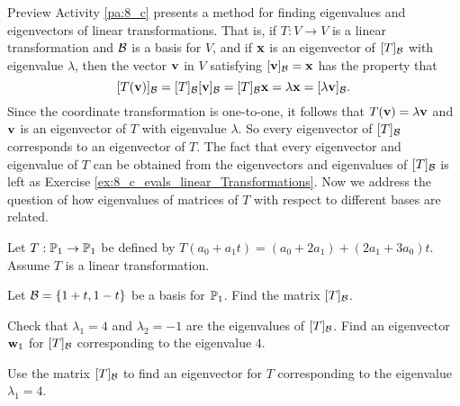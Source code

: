 
Preview Activity \ref{pa:8_c} presents a method for finding eigenvalues and eigenvectors of linear transformations. That is, if $T: V \to V$ is a linear transformation and $\mathcal{B}$ is a basis for $V$, and if $\mathbf{x}$ is an eigenvector of $[T]_{\mathcal{B}}$ with eigenvalue $\lambda$, then the vector $\mathbf{v}$ in $V$ satisfying $[\mathbf{v}]_{\mathcal{B}}=\mathbf{x}$ has the property that 
\[[T(\mathbf{v})]_{\mathcal{B}} = [T]_{\mathcal{B}}[\mathbf{v}]_{\mathcal{B}} = [T]_{\mathcal{B}} \mathbf{x} = \lambda \mathbf{x} = [\lambda \mathbf{v}]_{\mathcal{B}}.\]
Since the coordinate transformation is one-to-one, it follows that $T(\mathbf{v}) = \lambda \mathbf{v}$ and $\mathbf{v}$ is an eigenvector of $T$ with eigenvalue $\lambda$. So every eigenvector of $[T]_{\mathcal{B}}$ corresponds to an eigenvector of $T$. The fact that every eigenvector and eigenvalue of $T$ can be obtained from the eigenvectors and eigenvalues of $[T]_{\mathcal{B}}$ is left as Exercise \ref{ex:8_c_evals_linear_Transformations}.  Now we address the question of how eigenvalues of matrices of $T$ with respect to different bases are related.



\begin{activity} \label{act:8_c_ltev2} Let $T: \mathbb{P}_1 \to \mathbb{P}_1$ be defined by $T(a_0+a_1t) = (a_0+2a_1) + (2a_1+3a_0)t$. Assume $T$ is a linear transformation.
	\ba
	\item Let $\mathcal{B} = \{1+t,1-t\}$ be a basis for $\mathbb{P}_1$. Find the matrix $[T]_{\mathcal{B}}$.
	
	
	\item Check that $\lambda_1 = 4$ and $\lambda_2 = -1$ are the eigenvalues of $[T]_{\mathcal{B}}$. Find an eigenvector $\mathbf{w}_1$ for $[T]_{\mathcal{B}}$ corresponding to the eigenvalue $4$.
	
	
	\item Use the matrix $[T]_{\mathcal{B}}$ to find an eigenvector for $T$ corresponding to the eigenvalue $\lambda_1 = 4$.


	\ea

\end{activity}

